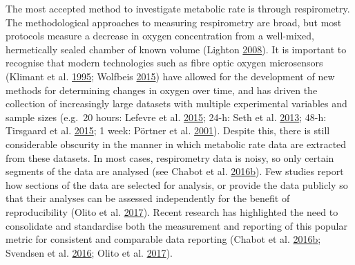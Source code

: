 \documentclass[a4paper,10pt, oneside]{memoir}
\begin{document}
The most accepted method to investigate metabolic rate is through respirometry.
The methodological approaches to measuring respirometry are broad, but most protocols measure a decrease in oxygen concentration from a well-mixed, hermetically sealed chamber of known volume (Lighton \protect\hyperlink{ref-Lighton2008}{2008}).
It is important to recognise that modern technologies such as fibre optic oxygen microsensors (Klimant et al. \protect\hyperlink{ref-Klimant1995}{1995}; Wolfbeis \protect\hyperlink{ref-Wolfbeis2015}{2015}) have allowed for the development of new methods for determining changes in oxygen over time, and has driven the collection of increasingly large datasets with multiple experimental variables and sample sizes (e.g.~20 hours: Lefevre et al. \protect\hyperlink{ref-Lefevre2015}{2015}; 24-h: Seth et al. \protect\hyperlink{ref-Seth2013}{2013}; 48-h: Tirsgaard et al. \protect\hyperlink{ref-Tirsgaard2015}{2015}; 1 week: Pörtner et al. \protect\hyperlink{ref-Portner2001}{2001}).
Despite this, there is still considerable obscurity in the manner in which metabolic rate data are extracted from these datasets.
In most cases, respirometry data is noisy, so only certain segments of the data are analysed (see Chabot et al. \protect\hyperlink{ref-Chabot2016}{2016}\protect\hyperlink{ref-Chabot2016}{b}).
Few studies report how sections of the data are selected for analysis, or provide the data publicly so that their analyses can be assessed independently for the benefit of reproducibility (Olito et al. \protect\hyperlink{ref-Olito2017}{2017}).
Recent research has highlighted the need to consolidate and standardise both the measurement and reporting of this popular metric for consistent and comparable data reporting (Chabot et al. \protect\hyperlink{ref-Chabot2016}{2016}\protect\hyperlink{ref-Chabot2016}{b}; Svendsen et al. \protect\hyperlink{ref-Svendsen2016}{2016}; Olito et al. \protect\hyperlink{ref-Olito2017}{2017}).
\end{document}

